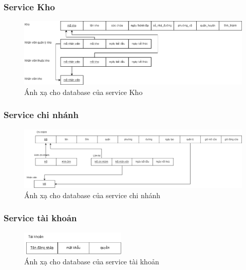\subsubsection{Service Kho}
\begin{figure}[!htp]
    \begin{center}
        \includegraphics[width=1\textwidth]{img/database/mapping/mapping-kho.png}
        \newline
        \caption{Ánh xạ cho database của service Kho}
    \end{center}
\end{figure}

\subsubsection{Service chi nhánh}
\begin{figure}[!htp]
    \begin{center}
        \includegraphics[width=1\textwidth]{img/database/mapping/branch.png}
        \newline
        \caption{Ánh xạ cho database của service chi nhánh}
    \end{center}
\end{figure}


\subsubsection{Service tài khoản}
\begin{figure}[!htp]
    \begin{center}
        \includegraphics[width=5cm]{img/database/mapping/account.png}
        \newline
        \caption{Ánh xạ cho database của service tài khoản}
    \end{center}
\end{figure}

